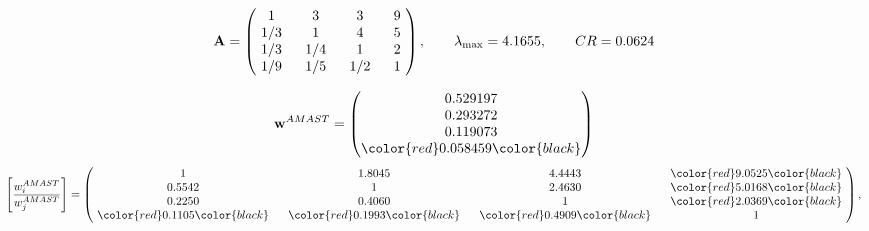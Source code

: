 \begin{example}
\begin{equation*}
\mathbf{A} =
\begin{pmatrix}
$\,\,$ 1 $\,\,$ & $\,\,$3$\,\,$ & $\,\,$3$\,\,$ & $\,\,$9 $\,\,$ \\
$\,\,$ 1/3$\,\,$ & $\,\,$ 1 $\,\,$ & $\,\,$4$\,\,$ & $\,\,$5 $\,\,$ \\
$\,\,$ 1/3$\,\,$ & $\,\,$ 1/4$\,\,$ & $\,\,$ 1 $\,\,$ & $\,\,$2 $\,\,$ \\
$\,\,$ 1/9$\,\,$ & $\,\,$ 1/5$\,\,$ & $\,\,$ 1/2$\,\,$ & $\,\,$ 1  $\,\,$ \\
\end{pmatrix},
\qquad
\lambda_{\max} =
4.1655,
\qquad
CR = 0.0624
\end{equation*}

\begin{equation*}
\mathbf{w}^{AMAST} =
\begin{pmatrix}
0.529197\\
0.293272\\
0.119073\\
\color{red} 0.058459\color{black}
\end{pmatrix}\end{equation*}
\begin{equation*}
\left[ \frac{{w}^{AMAST}_i}{{w}^{AMAST}_j} \right] =
\begin{pmatrix}
$\,\,$ 1 $\,\,$ & $\,\,$1.8045$\,\,$ & $\,\,$4.4443$\,\,$ & $\,\,$\color{red} 9.0525\color{black} $\,\,$ \\
$\,\,$0.5542$\,\,$ & $\,\,$ 1 $\,\,$ & $\,\,$2.4630$\,\,$ & $\,\,$\color{red} 5.0168\color{black}   $\,\,$ \\
$\,\,$0.2250$\,\,$ & $\,\,$0.4060$\,\,$ & $\,\,$ 1 $\,\,$ & $\,\,$\color{red} 2.0369\color{black}  $\,\,$ \\
$\,\,$\color{red} 0.1105\color{black} $\,\,$ & $\,\,$\color{red} 0.1993\color{black} $\,\,$ & $\,\,$\color{red} 0.4909\color{black} $\,\,$ & $\,\,$ 1  $\,\,$ \\
\end{pmatrix},
\end{equation*}


\end{example}
